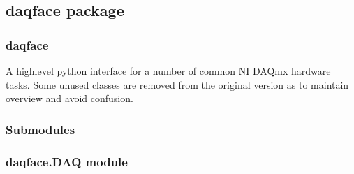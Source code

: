 \documentclass[letterpaper,10pt,english]{sphinxmanual}
\begin{document}
\sphinxstepscope


\subsection{daqface package}
\label{\detokenize{NoSeMazeControl/daqface:daqface-package}}\label{\detokenize{NoSeMazeControl/daqface::doc}}

\subsubsection{daqface}
\label{\detokenize{NoSeMazeControl/daqface:daqface}}
\sphinxAtStartPar
A high\sphinxhyphen{}level python interface for a number of common NI DAQmx hardware tasks. Some unused classes are removed from the original version as to maintain overview and avoid confusion.


\subsubsection{Submodules}
\label{\detokenize{NoSeMazeControl/daqface:submodules}}

\subsubsection{daqface.DAQ module}
\label{\detokenize{NoSeMazeControl/daqface:module-daqface.DAQ}}\label{\detokenize{NoSeMazeControl/daqface:daqface-daq-module}}
\end{document}
